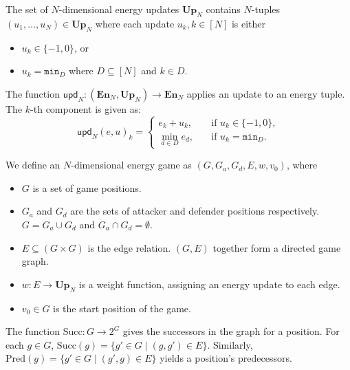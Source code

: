 \begin{definition}\label{def:update}
    The set of $N$-dimensional energy updates $\mathbf{Up}_N$ contains
    $N$-tuples $(u_1, \ldots, u_N) \in \mathbf{Up}_N$ where each update $u_k, k
    \in [N]$ is
    either
    \begin{itemize}
        \item $u_k \in \{-1, 0\}$, or
        \item $u_k = \mathtt{min}_D$ where $D \subseteq [N]$ and $k \in D$. %
    \end{itemize}

    The function
    $\mathsf{upd}_N: (\mathbf{En}_N, \mathbf{Up}_N) \rightarrow \mathbf{En}_N$
    applies an update to an energy tuple.
    The $k$-th component is given as:
    \begin{equation*}
        \mathsf{upd}_N{(e, u)}_k =
        \begin{cases}
            e_k + u_k,\quad &\text{if } u_k \in \{-1, 0\}, \\
            \min_{d \in D}{e_d},\quad &\text{if } u_k = \mathtt{min}_D. %
        \end{cases}
    \end{equation*}
\end{definition}

\begin{definition}\label{def:energy_game}
    We define an $N$-dimensional energy game as
    $(G, G_a, G_d, E, w, v_0)$, where 
    \begin{itemize}
        \item $G$ is a set of game positions.
        \item $G_a$ and $G_d$ are the sets of attacker and defender positions
            respectively.
            $G = G_a \cup G_d$ and $G_a \cap G_d = \emptyset$.
        \item $E \subseteq (G \times G)$ is the edge relation. $(G, E)$
            together form a directed game graph.
        \item $w: E \rightarrow \mathbf{Up}_N$ is a weight function, assigning an
            energy update to each edge.
        \item $v_0 \in G$ is the start position of the game.
    \end{itemize}

    The function $\mathrm{Succ}: G \rightarrow 2^G$ gives the successors in the
    graph for a position.
    For each $g \in G$, $\mathrm{Succ}(g) = \{g' \in G \mid (g, g') \in E\}$.
    Similarly, $\mathrm{Pred}(g) = \{g' \in G \mid (g', g) \in E\}$ yields a
    position's predecessors.
\end{definition}


